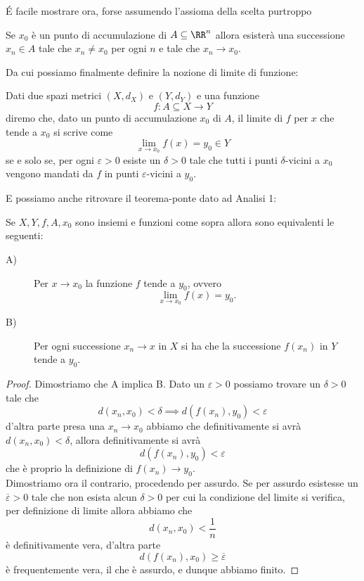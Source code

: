 \documentclass[11pt]{scrartcl}
\begin{document}
	\'E facile mostrare ora, forse assumendo l'assioma della scelta purtroppo
	\begin{proposition}
		Se $x_0$ è un punto di accumulazione di $A\subseteq \RR^n$ allora esisterà una successione $x_n\in A$ tale che $x_n\ne x_0$ per ogni $n$ e tale che $x_n\to x_0$.
	\end{proposition}
	Da cui possiamo finalmente definire la nozione di limite di funzione:
	\begin{definition}
		Dati due spazi metrici $(X,d_X)$ e $(Y,d_Y)$ e una funzione 
		$$f:A\subseteq X\to Y$$
		diremo che, dato un punto di accumulazione $x_0$ di $A$, il limite di $f$ per $x$ che tende a $x_0$ si scrive come
		$$\lim_{x\to x_0}f(x)=y_0\in Y$$
		se e solo se, per ogni $\varepsilon>0$ esiste un $\delta>0$ tale che tutti i punti $\delta$-vicini a $x_0$ vengono mandati da $f$ in punti $\varepsilon$-vicini a $y_0$.
	\end{definition}
	E possiamo anche ritrovare il teorema-ponte dato ad Analisi 1:
	\begin{theorem}
		Se $X,Y,f,A,x_0$ sono insiemi e funzioni come sopra allora sono equivalenti le seguenti:
		\begin{description}
			\item[A)] Per $x\to x_0$ la funzione $f$ tende a $y_0$, ovvero
			$$\lim_{x\to x_0}f(x)=y_0.$$ 
			\item[B)] Per ogni successione $x_n\to x$ in $X$ si ha che la successione $f(x_n)$ in $Y$ tende a $y_0$.
		\end{description}
	\end{theorem}
	\begin{proof}
		Dimostriamo che A implica B. Dato un $\varepsilon>0$ possiamo trovare un $\delta>0$ tale che 
		$$d(x_n,x_0)< \delta \implies d(f(x_n),y_0)<\varepsilon$$
		d'altra parte presa una $x_n\to x_0$ abbiamo che definitivamente si avrà $d(x_n,x_0)<\delta$, allora definitivamente si avrà
		$$d(f(x_n),y_0)<\varepsilon$$
		che è proprio la definizione di $f(x_n)\to y_0$. \\
		Dimostriamo ora il contrario, procedendo per assurdo. Se per assurdo esistesse un $\overline{\varepsilon}>0$ tale che non esista alcun $\delta>0$ per cui la condizione del limite si verifica, per definizione di limite allora abbiamo che
		$$d(x_n,x_0)<\frac{1}{n}$$
		è definitivamente vera, d'altra parte
		$$d(f(x_n),x_0)\ge \overline{\varepsilon}$$
		è frequentemente vera, il che è assurdo, e dunque abbiamo finito.
	\end{proof}
	
\end{document}
